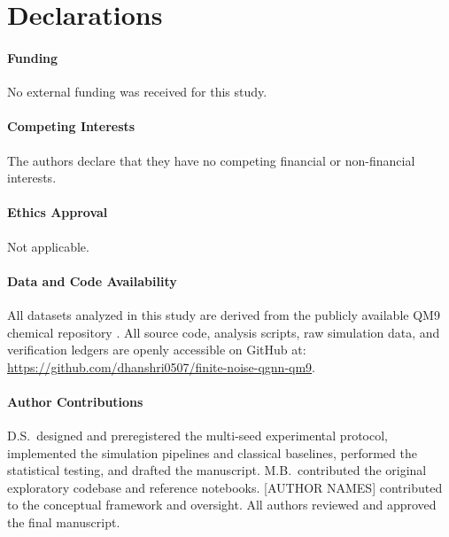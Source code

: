 \documentclass[sn-apacite,Numbered]{sn-jnl}
\begin{document}
\section*{Declarations}

\paragraph{Funding}
No external funding was received for this study.

\paragraph{Competing Interests}
The authors declare that they have no competing financial or non-financial interests.

\paragraph{Ethics Approval}
Not applicable.

\paragraph{Data and Code Availability}
All datasets analyzed in this study are derived from the publicly available QM9 chemical repository \cite{ramakrishnan2014quantum}. All source code, analysis scripts, raw simulation data, and verification ledgers are openly accessible on GitHub at: \url{https://github.com/dhanshri0507/finite-noise-qgnn-qm9}.

\paragraph{Author Contributions}
D.S.\ designed and preregistered the multi-seed experimental protocol, implemented the simulation pipelines and classical baselines, performed the statistical testing, and drafted the manuscript. M.B.\ contributed the original exploratory codebase and reference notebooks. [AUTHOR NAMES] contributed to the conceptual framework and oversight. All authors reviewed and approved the final manuscript.


\end{document}
